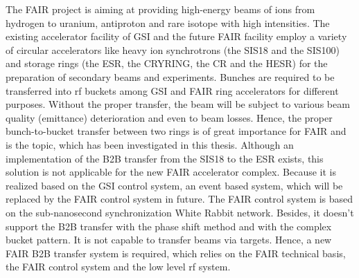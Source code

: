 The FAIR project is aiming at providing high-energy beams of ions from hydrogen to uranium, antiproton and rare isotope with high intensities. The existing accelerator facility of GSI and the future FAIR facility employ a variety of circular accelerators like heavy ion synchrotrons (the SIS18 and the SIS100) and storage rings (the ESR, the CRYRING, the CR and the HESR) for the preparation of secondary beams and experiments. Bunches are required to be transferred into rf buckets among GSI and FAIR ring accelerators for different purposes. Without the proper transfer, the beam will be subject to various beam quality (emittance) deterioration and even to beam losses. Hence, the proper bunch-to-bucket transfer between two rings is of great importance for FAIR and is the topic, which has been investigated in this thesis. Although an implementation of the B2B transfer from the SIS18 to the ESR exists, this solution is not applicable for the new FAIR accelerator complex. Because it is realized based on the GSI control system, an event based system, which will be replaced by the FAIR control system in future. The FAIR control system is based on the sub-nanosecond synchronization White Rabbit network. Besides, it doesn't support the B2B transfer with the phase shift method and with the complex bucket pattern. It is not capable to transfer beams via targets. Hence, a new FAIR B2B transfer system is required, which relies on the FAIR technical basis, the FAIR control system and the low level rf system.


